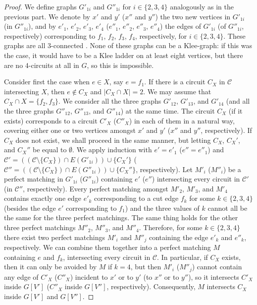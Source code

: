 \documentclass[]{theclass}
\begin{document}
\begin{proof}
We define graphs $G'_{1i}$ and $G''_{1i}$ for $i\in \{2,3,4\}$ analogously as in the previous part. We denote by $x'$ and $y'$ ($x''$ and $y''$) the two new vertices in $G'_{1i}$ (in $G''_{1i}$), and by $e'_1$, $e'_2$, $e'_3$, $e'_4$ ($e''_1$, $e''_2$, $e''_3$, $e''_4$) the edges of $G'_{1i}$ (of $G''_{1i}$, respectively) corresponding to $f_1$, $f_2$, $f_3$, $f_4$, respectively, for $i\in\{2,3,4\}$. These graphs are all 3-connected \cite{EKK}. None of these graphs can be a Klee-graph: if this was the case, it would have to be a Klee ladder on at least eight vertices, but there are no 4-circuits at all in $G$, so this is impossible.

Consider first the case when $e\in X$, say $e=f_1$. If there is a circuit $C_X$ in $\mathcal{C}$ intersecting $X$, then $e\notin C_X$ and $|C_X\cap X|=2$. We may assume that $C_X\cap X=\{f_2,f_3\}$.
We consider all the three graphs $G'_{12}$, $G'_{13}$, and $G'_{14}$ (and all the three graphs $G''_{12}$, $G''_{13}$, and $G''_{14}$) at the same time. The circuit $C_X$ (if it exists) corresponds to a circuit $C'_X$ ($C''_X$) in each of them in a natural way, covering either one or two vertices  amongst $x'$ and $y'$ ($x''$ and $y''$, respectively). If $C_X$ does not exist, we shall proceed in the same manner, but letting $C_X$, $C_X'$, and $C_X''$ be equal to $\emptyset$. We apply induction with $e'=e'_1$ ($e''=e''_1$) and $\mathcal{C}'=((\mathcal{C}\setminus \{C_X\})\cap E(G'_{1i})) \cup \{C_X'\}$ ($\mathcal{C}''=((\mathcal{C}\setminus \{C_X\})\cap E(G''_{1i}))\cup \{C_X''\}$, respectively). Let $M'_i$ ($M''_i$) be a perfect matching in $G'_{1i}$ ($G''_{1i}$) containing $e'$ ($e''$) intersecting every circuit in $\mathcal{C'}$ (in $\mathcal{C''}$, respectively). Every perfect matching  amongst $M'_2$, $M'_3$, and $M'_4$ contains exactly one edge $e'_k$ corresponding to a cut edge $f_k$ for some $k\in\{2,3,4\}$ (besides the edge $e'$ corresponding to $f_1$) and the three values of $k$ cannot all be the same for the three perfect matchings. The same thing holds for the other three perfect matchings $M''_2$, $M''_3$, and $M''_4$. Therefore, for some $k\in\{2,3,4\}$ there exist two perfect matchings $M'_i$ and $M''_j$ containing the edge $e'_k$ and $e''_k$, respectively. We can combine them together into a perfect matching $M$ containing $e$ and $f_k$, intersecting every circuit in $\mathcal{C}$. In particular, if $C_X$ exists, then it can only be avoided by $M$ if $k=4$, but then $M'_i$ ($M''_j$) cannot contain any edge of $C'_X$ ($C''_X$) incident to $x'$ or to $y'$ (to $x''$ or to $y''$), so it intersects $C'_X$ inside $G[V']$ ($C''_X$ inside $G[V'']$, respectively). Consequently, $M$ intersects $C_X$ inside $G[V']$ and $G[V'']$. 


\end{proof}
\end{document}
